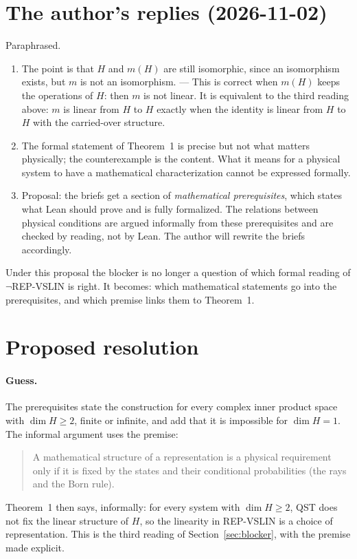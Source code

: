 \documentclass[11pt]{article}
\begin{document}
\section{The author's replies (2026-11-02)}
Paraphrased.
\begin{enumerate}
\item The point is that $H$ and $m(H)$ are still isomorphic, since an isomorphism exists, but
  $m$ is not an isomorphism. --- This is correct when $m(H)$ keeps the operations of $H$: then
  $m$ is not linear. It is equivalent to the third reading above: $m$ is linear from $H$ to
  $H$ exactly when the identity is linear from $H$ to $H$ with the carried-over structure.
\item The formal statement of Theorem~1 is precise but not what matters physically; the
  counterexample is the content. What it means for a physical system to have a mathematical
  characterization cannot be expressed formally.
\item Proposal: the briefs get a section of \emph{mathematical prerequisites}, which states
  what Lean should prove and is fully formalized. The relations between physical conditions
  are argued informally from these prerequisites and are checked by reading, not by Lean. The
  author will rewrite the briefs accordingly.
\end{enumerate}
Under this proposal the blocker is no longer a question of which formal reading of
$\neg$REP-VSLIN is right. It becomes: which mathematical statements go into the prerequisites,
and which premise links them to Theorem~1.

\section{Proposed resolution}
\paragraph{Guess.} The prerequisites state the construction for every complex inner product
space with $\dim H \ge 2$, finite or infinite, and add that it is impossible for
$\dim H = 1$. The informal argument uses the premise:
\begin{quote}
  A mathematical structure of a representation is a physical requirement only if it is fixed
  by the states and their conditional probabilities (the rays and the Born rule).
\end{quote}
Theorem~1 then says, informally: for every system with $\dim H \ge 2$, QST does not fix the
linear structure of $H$, so the linearity in REP-VSLIN is a choice of representation. This is
the third reading of Section~\ref{sec:blocker}, with the premise made explicit.
\end{document}
